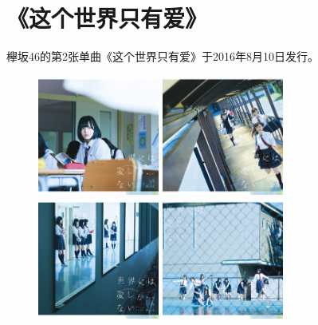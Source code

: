 ﻿
\chapter{《这个世界只有爱》}

欅坂46的第2张单曲《这个世界只有爱》于2016年8月10日发行。
\\

\begin{figure}[htp]
  \centering
  {\includegraphics[width=40mm]{images/single-2/2-1.jpg}}
  {\includegraphics[width=40mm]{images/single-2/2-2.jpg}}
  \\
  {\includegraphics[width=40mm]{images/single-2/2-3.jpg}}
  {\includegraphics[width=40mm]{images/single-2/2-4.jpg}}
\end{figure}


\thispagestyle{empty} %
\clearpage





       \clearpage
          \clearpage
  \clearpage
       \clearpage
               \clearpage
   \clearpage
           \clearpage


